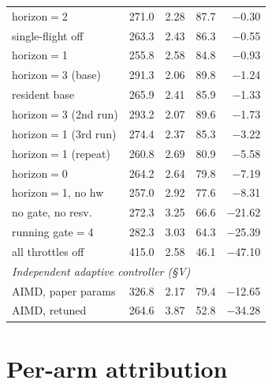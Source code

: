 \documentclass[10pt]{article}
\begin{document}
\begin{tabular}{lrrrr}
    horizon$=$2       & 271.0 & 2.28 & 87.7 & $-$0.30 \\
    single-flight off & 263.3 & 2.43 & 86.3 & $-$0.55 \\
    horizon$=$1       & 255.8 & 2.58 & 84.8 & $-$0.93 \\
    horizon$=$3 (base) & 291.3 & 2.06 & 89.8 & $-$1.24 \\
    resident base     & 265.9 & 2.41 & 85.9 & $-$1.33 \\
    horizon$=$3 (2nd run) & 293.2 & 2.07 & 89.6 & $-$1.73 \\
    horizon$=$1 (3rd run) & 274.4 & 2.37 & 85.3 & $-$3.22 \\
    horizon$=$1 (repeat) & 260.8 & 2.69 & 80.9 & $-$5.58 \\
    horizon$=$0       & 264.2 & 2.64 & 79.8 & $-$7.19 \\
    horizon$=$1, no hw & 257.0 & 2.92 & 77.6 & $-$8.31 \\
    no gate, no resv. & 272.3 & 3.25 & 66.6 & $-$21.62 \\
    running gate$=$4  & 282.3 & 3.03 & 64.3 & $-$25.39 \\
    all throttles off & 415.0 & 2.58 & 46.1 & $-$47.10 \\
    \midrule
    \multicolumn{5}{l}{\emph{Independent adaptive controller (\S V)}}\\
    AIMD, paper params & 326.8 & 2.17 & 79.4 & $-$12.65 \\
    AIMD, retuned     & 264.6 & 3.87 & 52.8 & $-$34.28 \\
    \bottomrule
  \end{tabular}

\section{Per-arm attribution}
\end{document}
